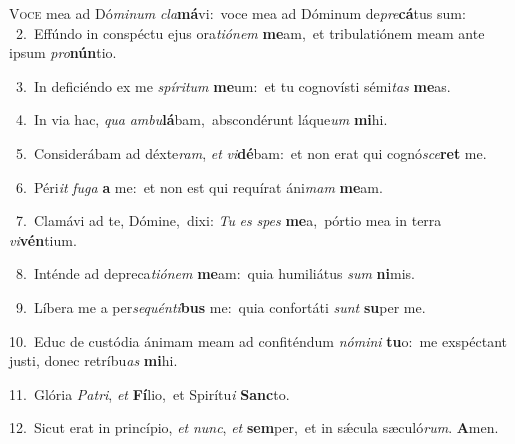 \lettrine{\initial\textcolor{\initialcolor}{V}}{oce} mea ad Dó\-\textit{mi}\-\textit{num} \textit{cla}\-\textbf{má}vi:~\star voce mea ad Dóminum de\-\textit{pre}\-\textbf{cá}tus sum:\\
{\numbfont\textcolor{\numbcolor}{~2.}}~Effúndo in conspéctu ejus ora\-\textit{ti}\-\textit{ó}\textit{nem} \textbf{me}\-am,~\star et tribulatiónem meam ante ipsum \textit{pro}\-\textbf{nún}tio.\par
{\numbfont\textcolor{\numbcolor}{~3.}}~In deficiéndo ex me \textit{spí}\-\textit{ri}\textit{tum} \textbf{me}\-um:~\star et tu cognovísti sémi\textit{tas} \textbf{me}\-as.\par
{\numbfont\textcolor{\numbcolor}{~4.}}~In via hac, \textit{qua} \textit{am}\-\textit{bu}\textbf{lá}bam,~\star abscondérunt láque\textit{um} \textbf{mi}\-hi.\par
{\numbfont\textcolor{\numbcolor}{~5.}}~Considerábam ad déxte\-\textit{ram}\-, \textit{et} \textit{vi}\-\textbf{dé}bam:~\star et non erat qui cognó\-\textit{sce}\-\textbf{ret} me.\par
{\numbfont\textcolor{\numbcolor}{~6.}}~Péri\textit{it} \textit{fu}\-\textit{ga} \textbf{a} me:~\star et non est qui requírat áni\textit{mam} \textbf{me}\-am.\par
{\numbfont\textcolor{\numbcolor}{~7.}}~Clamávi ad te, Dómine,~\dagger dixi: \textit{Tu} \textit{es} \textit{spes} \textbf{me}\-a,~\star pórtio mea in terra \textit{vi}\-\textbf{vén}tium.\par
{\numbfont\textcolor{\numbcolor}{~8.}}~Inténde ad depreca\-\textit{ti}\-\textit{ó}\textit{nem} \textbf{me}\-am:~\star quia humiliátus \textit{sum} \textbf{ni}\-mis.\par
{\numbfont\textcolor{\numbcolor}{~9.}}~Líbera me a per\-\textit{se}\-\textit{quén}\textit{ti}\textbf{bus} me:~\star quia confortáti \textit{sunt} \textbf{su}\-per me.\par
{\numbfont\textcolor{\numbcolor}{10.}}~Educ de custódia ánimam meam ad confiténdum \textit{nó}\-\textit{mi}\textit{ni} \textbf{tu}\-o:~\star me exspéctant justi, donec retríbu\textit{as} \textbf{mi}\-hi.\par
{\numbfont\textcolor{\numbcolor}{11.}}~Glória \textit{Pa}\-\textit{tri}, \textit{et} \textbf{Fí}\-lio,~\star et Spirítu\textit{i} \textbf{Sanc}\-to.\par
{\numbfont\textcolor{\numbcolor}{12.}}~Sicut erat in princípio, \textit{et} \textit{nunc}\-, \textit{et} \textbf{sem}\-per,~\star et in sǽcula sæculó\-\textit{rum}\-. \textbf{A}\-men.\par

